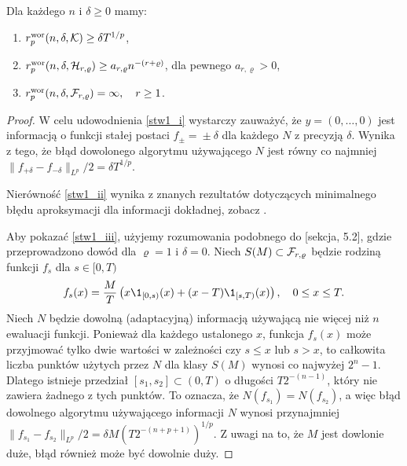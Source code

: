 \documentclass[oik, pdftex, man]{mgrwms}
\begin{document}
    \begin{stw} \label{stw1}
        Dla każdego $n$ i $\delta \geq 0$ mamy:
        \begin{enumerate}[label=(\roman*)]
            \item \label{stw1_i} $r^{\mathrm{wor}}_{p}(n, \delta, \mathcal{K}) \geq \delta T^{1/p}$,
            \item \label{stw1_ii} $r^{\mathrm{wor}}_{p}(n, \delta, \mathcal{H}_{r,\varrho}) \geq a_{r,\varrho}n^{-(r + \varrho)}$, dla pewnego $a_{r,\varrho} > 0$,
            \item \label{stw1_iii} $r^{\mathrm{wor}}_{p}(n, \delta, \mathcal{F}_{r,\varrho}) = \infty, \quad r \geq 1$.
        \end{enumerate}
    \end{stw}
    \begin{proof}
        W celu udowodnienia \ref{stw1_i} wystarczy zauważyć, że $y = (0, \ldots, 0)$ jest informacją o funkcji stałej postaci $f_{\pm} \!=\! \pm \delta$ dla każdego $N$ z precyzją $\delta$. Wynika z tego, że błąd dowolonego algorytmu używającego $N$ jest równy co najmniej $\| f_{+\delta} - f_{-\delta} \|_{L^{p}} / 2 = \delta T^{1/p}$.

        Nierówność \ref{stw1_ii} wynika z znanych rezultatów dotyczących minimalnego błędu aproksymacji dla informacji dokładnej, zobacz \cite{DaS}.

        Aby pokazać \ref{stw1_iii}, użyjemy rozumowania podobnego do \cite{PoA} [sekcja, 5.2], gdzie przeprowadzono dowód dla $\varrho = 1$ i $\delta = 0$. Niech $S(M) \subset \mathcal{F}_{r, \varrho}$ będzie rodziną funkcji $f_{s}$ dla $s \in [0, T)$
        \begin{equation*}
            f_{s}(x) = \frac{M}{T}\left( x\1_{[0,s)}(x) + (x-T)\1_{[s,T)}(x) \right), \quad 0 \leq x \leq T.
        \end{equation*}
        Niech $N$ będzie dowolną (adaptacyjną) informacją używającą nie więcej niż $n$ ewaluacji funkcji. Ponieważ dla każdego ustalonego $x$, funkcja $f_{s}(x)$ może przyjmować tylko dwie wartości w zależności czy $s \leq x$ lub $s > x$, to całkowita liczba punktów użytych przez $N$ dla klasy $S(M)$ wynosi co najwyżej $2^{n}-1$. Dlatego istnieje przedział $[s_{1}, s_{2}] \subset (0,T)$ o długości $T 2^{-(n-1)}$, który nie zawiera żadnego z tych punktów. To oznacza, że  $N(f_{s_{1}}) = N(f_{s_{2}})$, a więc błąd dowolnego algorytmu używającego informacji $N$ wynosi przynajmniej $\| f_{s_{1}} - f_{s_{2}} \|_{L^{p}} / 2 = \delta M(T 2^{-(n+p+1)})^{1/p}$. Z uwagi na to, że $M$ jest dowlonie duże, błąd również może być dowolnie duży.
    \end{proof}
\end{document}
